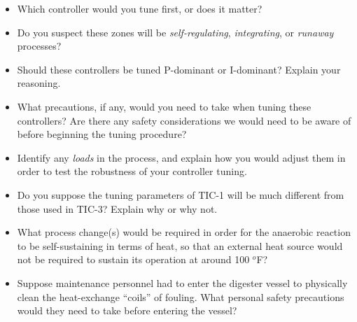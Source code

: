 \begin{itemize}
\item{} Which controller would you tune first, or does it matter?
\item{} Do you suspect these zones will be {\it self-regulating}, {\it integrating}, or {\it runaway} processes?
\item{} Should these controllers be tuned P-dominant or I-dominant?  Explain your reasoning.
\item{} What precautions, if any, would you need to take when tuning these controllers?  Are there any safety considerations we would need to be aware of before beginning the tuning procedure?
\item{} Identify any {\it loads} in the process, and explain how you would adjust them in order to test the robustness of your controller tuning.
\item{} Do you suppose the tuning parameters of TIC-1 will be much different from those used in TIC-3?  Explain why or why not.
\item{} What process change(s) would be required in order for the anaerobic reaction to be self-sustaining in terms of heat, so that an external heat source would not be required to sustain its operation at around 100 $^{o}$F?
\item{} Suppose maintenance personnel had to enter the digester vessel to physically clean the heat-exchange ``coils'' of fouling.  What personal safety precautions would they need to take before entering the vessel?
\end{itemize}







